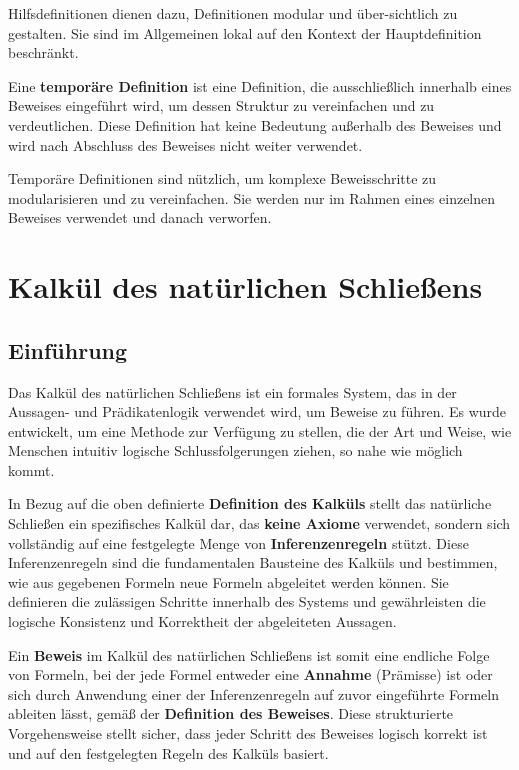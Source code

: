 \documentclass[main.tex]{subfiles}
\begin{document}
\begin{remark}
Hilfsdefinitionen dienen dazu, Definitionen modular und über-sichtlich zu gestalten. Sie sind im Allgemeinen lokal auf den Kontext der Hauptdefinition beschränkt.
\end{remark}

\begin{definition}
Eine \textbf{temporäre Definition} ist eine Definition, die ausschließlich innerhalb eines Beweises eingeführt wird, um dessen Struktur zu vereinfachen und zu verdeutlichen. Diese Definition hat keine Bedeutung außerhalb des Beweises und wird nach Abschluss des Beweises nicht weiter verwendet.
\end{definition}

\begin{remark}
Temporäre Definitionen sind nützlich, um komplexe Beweisschritte zu modularisieren und zu vereinfachen. Sie werden nur im Rahmen eines einzelnen Beweises verwendet und danach verworfen.
\end{remark}

\section{Kalkül des natürlichen Schließens}

\subsection{Einführung}
Das Kalkül des natürlichen Schließens ist ein formales System, das in der Aussagen- und Prädikatenlogik verwendet wird, um Beweise zu führen. Es wurde entwickelt, um eine Methode zur Verfügung zu stellen, die der Art und Weise, wie Menschen intuitiv logische Schlussfolgerungen ziehen, so nahe wie möglich kommt.

In Bezug auf die oben definierte \textbf{Definition des Kalküls} stellt das natürliche Schließen ein spezifisches Kalkül dar, das \textbf{keine Axiome} verwendet, sondern sich vollständig auf eine festgelegte Menge von \textbf{Inferenzenregeln} stützt. Diese Inferenzenregeln sind die fundamentalen Bausteine des Kalküls und bestimmen, wie aus gegebenen Formeln neue Formeln abgeleitet werden können. Sie definieren die zulässigen Schritte innerhalb des Systems und gewährleisten die logische Konsistenz und Korrektheit der abgeleiteten Aussagen.

Ein \textbf{Beweis} im Kalkül des natürlichen Schließens ist somit eine endliche Folge von Formeln, bei der jede Formel entweder eine \textbf{Annahme} (Prämisse) ist oder sich durch Anwendung einer der Inferenzenregeln auf zuvor eingeführte Formeln ableiten lässt, gemäß der \textbf{Definition des Beweises}. Diese strukturierte Vorgehensweise stellt sicher, dass jeder Schritt des Beweises logisch korrekt ist und auf den festgelegten Regeln des Kalküls basiert.
\end{document}
